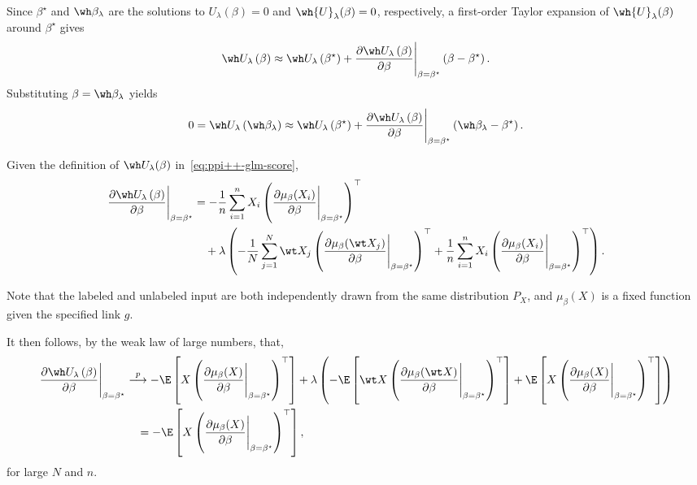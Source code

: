 \noindent
Since $\beta^\star$ and $\wh\beta_\lambda$ are the solutions to $U_\lambda(\beta)=0$ and $\wh{U}_\lambda(\beta)=0$, respectively, a first-order Taylor expansion of $\wh{U}_\lambda(\beta)$ around $\beta^\star$ gives
\begin{equation*}
    \wh U_\lambda\left(\beta\right)\approx
    \wh U_\lambda\left(\beta^\star\right)
    +\frac{\partial \wh U_\lambda\left(\beta\right)}{\partial \beta}\Bigg\vert_{\beta=\beta^\star}\left(\beta-\beta^\star\right).
\end{equation*}
Substituting $\beta=\wh\beta_\lambda$ yields
\begin{align*}
0=\wh U_\lambda\left(\wh\beta_\lambda\right)\approx
    \wh U_\lambda\left(\beta^\star\right)
    +\frac{\partial \wh U_\lambda\left(\beta\right)}{\partial \beta}\Bigg\vert_{\beta=\beta^\star}\left(\wh\beta_\lambda-\beta^\star\right).
\end{align*}

\noindent
Given the definition of $\wh U_\lambda(\beta)$ in~\eqref{eq:ppi++-glm-score}, 
\begin{align*}
    \frac{\partial \wh U_\lambda\left(\beta\right)}{\partial \beta}\Bigg\vert_{\beta=\beta^\star}
    &=-\frac{1}{n}\sum^n_{i=1}X_i\left(\frac{\partial \mu_{\beta}(X_i)}{\partial \beta}\Bigg\vert_{\beta=\beta^\star}\right)^\top\\
    &\quad +\lambda\left(-\frac{1}{N}\sum^N_{j=1}\wt X_j\left(\frac{\partial \mu_{\beta}(\wt X_j)}{\partial \beta}\Bigg\vert_{\beta=\beta^\star}\right)^\top
    +\frac{1}{n}\sum^n_{i=1}X_i\left(\frac{\partial \mu_{\beta}(X_i)}{\partial \beta}\Bigg\vert_{\beta=\beta^\star}\right)^\top\right).
\end{align*}

\noindent
Note that the labeled and unlabeled input are both independently drawn from the same distribution $P_X$,  and $\mu_\beta(X)$ is a fixed function given the specified link $g$.

\noindent
It then follows, by the weak law of large numbers, that,
\begin{align*}
    \frac{\partial \wh U_\lambda\left(\beta\right)}{\partial \beta}\Bigg\vert_{\beta=\beta^\star}
    &\overset{p}{\longrightarrow}
    -\E\left[X\left(\frac{\partial \mu_{\beta}(X)}{\partial \beta}\Bigg\vert_{\beta=\beta^\star}\right)^\top\right]
    +\lambda\left(-\E\left[\wt X\left(\frac{\partial \mu_{\beta}(\wt X)}{\partial \beta}\Bigg\vert_{\beta=\beta^\star}\right)^\top
    \right]+\E\left[ X\left(\frac{\partial \mu_{\beta}(X)}{\partial \beta}\Bigg\vert_{\beta=\beta^\star}\right)^\top\right]\right)\\
    &\quad =-\E\left[X\left(\frac{\partial \mu_{\beta}(X)}{\partial \beta}\Bigg\vert_{\beta=\beta^\star}\right)^\top\right],
\end{align*}for large $N$ and $n$.

